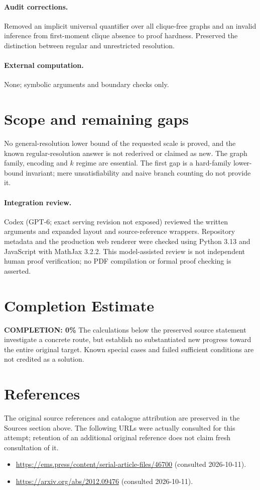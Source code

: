 \documentclass[11pt]{article}
\begin{document}
\paragraph{Audit corrections.} Removed an implicit universal quantifier over all clique-free graphs and an invalid inference from first-moment clique absence to proof hardness. Preserved the distinction between regular and unrestricted resolution.
\paragraph{External computation.} None; symbolic arguments and boundary checks only.
\section{Scope and remaining gaps}
No general-resolution lower bound of the requested scale is proved, and the known regular-resolution answer is not rederived or claimed as new. The graph family, encoding and $k$ regime are essential. The first gap is a hard-family lower-bound invariant; mere unsatisfiability and naive branch counting do not provide it.
\paragraph{Integration review.} Codex (GPT-6; exact serving revision not exposed) reviewed the written arguments and expanded layout and source-reference wrappers. Repository metadata and the production web renderer were checked using Python 3.13 and JavaScript with MathJax 3.2.2. This model-assisted review is not independent human proof verification; no PDF compilation or formal proof checking is asserted.

\section{Completion Estimate}
\noindent\textbf{COMPLETION: 0\%}
The calculations below the preserved source statement investigate a concrete route,
but establish no substantiated new progress toward the entire original target.
Known special cases and failed sufficient conditions are not credited as a solution.
\section{References}
The original source references and catalogue attribution are preserved in the
Sources section above. The following URLs were actually consulted for this attempt;
retention of an additional original reference does not claim fresh consultation of it.
\begin{itemize}
\item \url{https://ems.press/content/serial-article-files/46700} (consulted 2026-10-11). 
\item \url{https://arxiv.org/abs/2012.09476} (consulted 2026-10-11). 
\end{itemize}
\end{document}

